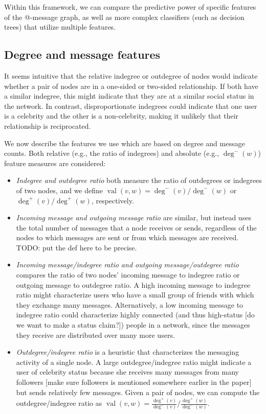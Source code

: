 \documentclass[conference]{IEEEtran}
\begin{document}
Within this framework, we can compare the predictive power of specific features of the @-message graph, as well as more complex classifiers (such as decision trees) that utilize multiple features.

\subsection{Degree and message features}
It seems intuitive that the relative indegree or outdegree of nodes would indicate whether a pair of nodes are in a one-sided or two-sided relationship. 
If both have a similar indegree, this might indicate that they are at a similar social status in the network. 
In contrast, disproportionate indegrees could indicate that one user is a celebrity and the other is a non-celebrity, making it unlikely that their relationship is reciprocated.

We now describe the features we use which are based on degree and message counts.  
Both relative (e.g., the ratio of indegrees) and absolute (e.g., $\deg^-(w)$) feature measures are considered:

\begin{itemize}
\item \emph{Indegree and outdegree ratio} both measure the ratio of outdegrees or indegrees of two nodes, and we define $\operatorname{val}(v,w) = \deg^-(v)/\deg^-(w)$ or $\deg^+(v)/\deg^+(w)$, respectively.

\item \emph{Incoming message and outgoing message ratio} are similar, but instead uses the total number of messages that a node receives or sends, regardless of the nodes to which messages are sent or from which  messages are received. TODO: put the def here to be precise.

\item \emph{Incoming message/indegree ratio and outgoing message/outdegree ratio} compares the ratio of two nodes' incoming message to indegree ratio or outgoing message to outdegree ratio. 
A high incoming message to indegree ratio might characterize users who have a small group of friends with which they exchange many messages.
Alternatively, a low incoming message to indegree ratio could characterize highly connected (and thus high-status [do we want to make a status claim?]) people in a network, since the messages they receive are distributed over many more users.

\item \emph{Outdegree/indegree ratio} is a heuristic that characterizes the messaging activity of a single node.  
A large outdegree/indegree ratio might indicate a user of celebrity status because she receives many messages from many followers [make sure followers is mentioned somewhere earlier in the paper] but sends relatively few messages. 
Given a pair of nodes, we can compute the outdegree/indegree ratio as $\operatorname{val}(v,w) = \frac{\deg^+(v)}{\deg^-(v)} / \frac{\deg^+(w)}{\deg^-(w)}$.
\end{itemize}
\end{document}
